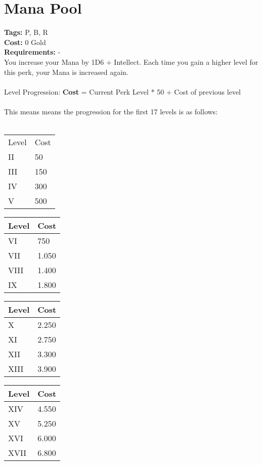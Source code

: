 \section{Mana Pool}\label{sec:manapool}
\textbf{Tags:} P, B, R\\
\textbf{Cost:} 0 Gold\\
\textbf{Requirements:} -\\
You increase your Mana by 1D6 + Intellect.
Each time you gain a higher level for this perk, your Mana is increased again.\\
\\
Level Progression: \textbf{Cost} = Current Perk Level * 50 + Cost of previous level\\
\\
This means means the progression for the first 17 levels is as follows:\\
\\
\begin{minipage}{0.25\textwidth}
    \begin{tabular}{l | l}
        Level & Cost\\
        II & 50\\
        III & 150\\
        IV & 300\\
        V & 500\\
    \end{tabular}
\end{minipage}
\begin{minipage}{0.25\textwidth}
    \begin{tabular}{l | l}
        Level & Cost\\ \hline
        VI & 750\\
        VII & 1.050\\
        VIII & 1.400\\
        IX & 1.800\\
    \end{tabular}
\end{minipage}
\begin{minipage}{0.25\textwidth}
    \begin{tabular}{l | l}
        Level & Cost\\ \hline
        X & 2.250\\
        XI & 2.750\\
        XII & 3.300\\
        XIII & 3.900\\
    \end{tabular}
\end{minipage}
\begin{minipage}{0.25\textwidth}
    \begin{tabular}{l | l}
        Level & Cost\\ \hline
        XIV & 4.550\\
        XV & 5.250\\
        XVI & 6.000\\
        XVII & 6.800\\
    \end{tabular}
\end{minipage}